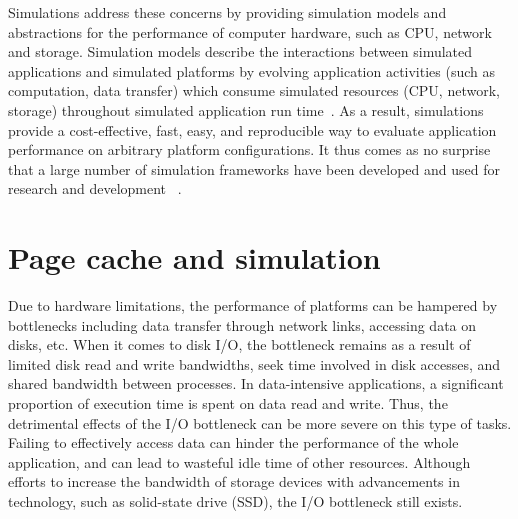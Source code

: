 Simulations address these concerns by providing simulation models and 
abstractions for the performance of computer hardware, such as CPU, 
network and storage. 
Simulation models describe the interactions between simulated applications 
and simulated platforms by evolving application activities (such as computation, 
data transfer) which consume simulated resources (CPU, network, storage) 
throughout simulated application run time~\cite{casanova2014simgrid}. 
As a result, simulations provide a cost-effective, fast, easy, and reproducible 
way to evaluate application performance on arbitrary platform configurations. 
It thus comes as no surprise that a large number of simulation frameworks 
have been developed and used for research and development
~\cite{ optorsim, gridsim, groudsim, cloudsim, nunez2012simcan,
nunez2012icancloud, mdcsim, dissect_cf, cloudnetsimplusplus, 
fognetsimplusplus, casanova2014simgrid, ROSS, casanova2020fgcs}. 

\section{Page cache and simulation}

Due to hardware limitations, the performance of platforms can be hampered 
by bottlenecks including data transfer through network links, accessing data 
on disks, etc. 
When it comes to disk I/O, the bottleneck remains as a result of limited 
disk read and write bandwidths, seek time involved in disk accesses, 
and shared bandwidth between processes. 
In data-intensive applications, a significant proportion of execution time 
is spent on data read and write.
Thus, the detrimental effects of the I/O bottleneck can be more severe on 
this type of tasks. 
Failing to effectively access data can hinder the performance of the 
whole application, and can lead to wasteful idle time of other resources. 
Although efforts to increase the bandwidth of storage devices with 
advancements in technology, such as solid-state drive (SSD), 
the I/O bottleneck still exists.

